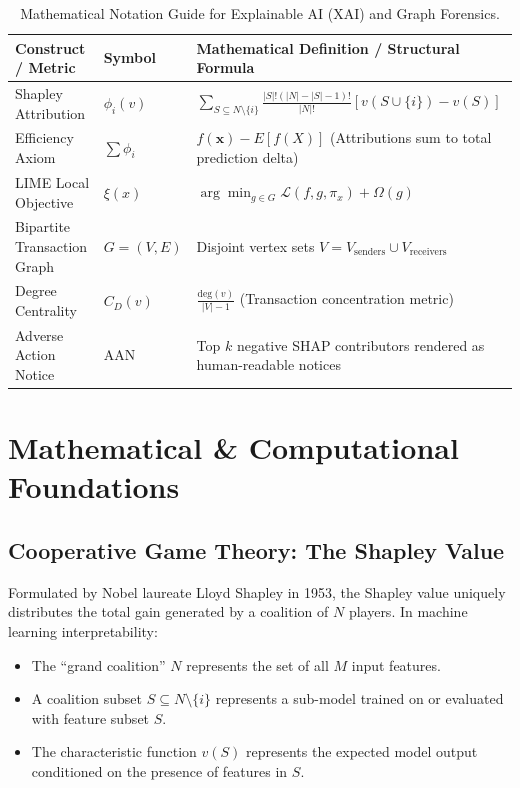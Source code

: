 \begin{table}[htbp]
\centering
\small
\begin{tabularx}{\textwidth}{llX}
\toprule
\textbf{Construct / Metric} & \textbf{Symbol} & \textbf{Mathematical Definition / Structural Formula} \\
\midrule
Shapley Attribution & $\phi_i(v)$ & $\sum_{S \subseteq N \setminus \{i\}} \frac{|S|!(|N| - |S| - 1)!}{|N|!} \left[ v(S \cup \{i\}) - v(S) \right]$ \\
Efficiency Axiom & $\sum \phi_i$ & $f(\mathbf{x}) - E[f(X)]$ (Attributions sum to total prediction delta) \\
LIME Local Objective & $\xi(x)$ & $\arg\min_{g \in G} \mathcal{L}(f, g, \pi_x) + \Omega(g)$ \\
Bipartite Transaction Graph & $G = (V, E)$ & Disjoint vertex sets $V = V_{\text{senders}} \cup V_{\text{receivers}}$ \\
Degree Centrality & $C_D(v)$ & $\frac{\text{deg}(v)}{|V| - 1}$ (Transaction concentration metric) \\
Adverse Action Notice & $\text{AAN}$ & Top $k$ negative SHAP contributors rendered as human-readable notices \\
\bottomrule
\end{tabularx}
\caption{Mathematical Notation Guide for Explainable AI (XAI) and Graph Forensics.}
\label{tab:w12_notation}
\end{table}

\section{Mathematical \& Computational Foundations}

\subsection{Cooperative Game Theory: The Shapley Value}
Formulated by Nobel laureate Lloyd Shapley in 1953, the Shapley value uniquely distributes the total gain generated by a coalition of $N$ players. In machine learning interpretability:
\begin{itemize}
    \item The ``grand coalition'' $N$ represents the set of all $M$ input features.
    \item A coalition subset $S \subseteq N \setminus \{i\}$ represents a sub-model trained on or evaluated with feature subset $S$.
    \item The characteristic function $v(S)$ represents the expected model output conditioned on the presence of features in $S$.
\end{itemize}

